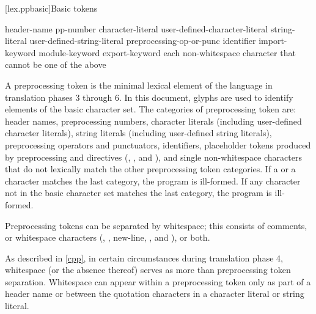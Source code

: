[lex.ppbasic]{Basic tokens}

%
\begin{bnf}
\br
    header-name\br
    pp-number\br
    character-literal\br
    user-defined-character-literal\br
    string-literal\br
    user-defined-string-literal\br
    preprocessing-op-or-punc\br
    identifier\br
    import-keyword\br
    module-keyword\br
    export-keyword\br
    \textnormal{each non-whitespace character that cannot be one of the above}
\end{bnf}

\pnum
A preprocessing token is the minimal lexical element of the language in translation
phases 3 through 6.
In this document,
glyphs are used to identify
elements of the basic character set.
The categories of preprocessing token are: header names, preprocessing numbers,
character literals (including user-defined character literals), string literals
(including user-defined string literals), preprocessing operators and punctuators,
identifiers, placeholder tokens produced by preprocessing  and
 directives (,
, and ),
and single non-whitespace characters that do not lexically match the other
preprocessing token categories.
If a  or a  character
matches the last category, the program is ill-formed.
If any character not in the basic character set matches the last category,
the program is ill-formed.

\pnum
Preprocessing tokens can be separated by
%
whitespace;
%
this consists of comments, or whitespace characters
(,
,
new-line,
, and
), or both.

\pnum
As described in \ref{cpp}, in certain
circumstances during translation phase 4, whitespace (or the absence
thereof) serves as more than preprocessing token separation. Whitespace
can appear within a preprocessing token only as part of a header name or
between the quotation characters in a character literal or
string literal.

